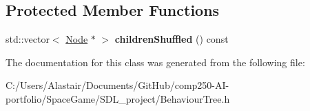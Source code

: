 \subsection*{Protected Member Functions}
\begin{DoxyCompactItemize}
\item 
\mbox{\label{class_behaviour_tree_1_1_composite_node_ad8ac82a2cae0640b712873202bd4df49}} 
std\+::vector$<$ \hyperlink{class_behaviour_tree_1_1_node}{Node} $\ast$ $>$ {\bfseries children\+Shuffled} () const
\end{DoxyCompactItemize}


The documentation for this class was generated from the following file\+:\begin{DoxyCompactItemize}
\item 
C\+:/\+Users/\+Alastair/\+Documents/\+Git\+Hub/comp250-\/\+A\+I-\/portfolio/\+Space\+Game/\+S\+D\+L\+\_\+project/Behaviour\+Tree.\+h\end{DoxyCompactItemize}
